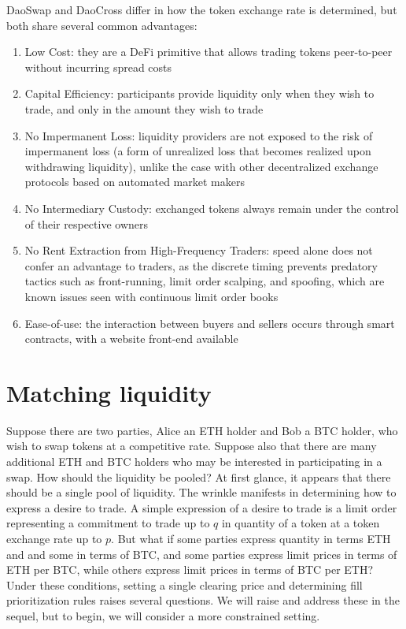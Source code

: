 \documentclass[11pt, reqno]{amsart}
\begin{document}
DaoSwap and DaoCross differ in how the token exchange rate is determined, but
both share several common advantages:
\begin{enumerate}
	\item Low Cost:
	      they are a DeFi primitive that allows trading tokens peer-to-peer
	      without incurring spread costs
	\item Capital Efficiency:
	      participants provide liquidity only when
	      they wish to trade, and only in the amount they wish to trade
	\item No Impermanent Loss:
	      liquidity providers are not exposed to the risk of impermanent loss
	      (a form of unrealized loss that becomes realized upon withdrawing
	      liquidity), unlike the case with other decentralized exchange protocols
	      based on automated market makers
	\item No Intermediary Custody:
	      exchanged tokens always remain under the control of their respective
	      owners
	\item No Rent Extraction from High-Frequency Traders:
	      speed alone does not confer an advantage to traders, as the discrete
	      timing prevents predatory tactics such as front-running, limit order
	      scalping, and spoofing, which are known issues seen with continuous
	      limit order books
	\item Ease-of-use: the interaction between buyers and sellers occurs
	      through smart contracts, with a website front-end available
\end{enumerate}


\section{Matching liquidity}
Suppose there are two parties, Alice an ETH holder and Bob a BTC holder, who
wish to swap tokens at a competitive rate. Suppose also that there are many
additional ETH and BTC holders who may be interested in participating in a
swap. How should the liquidity be pooled? At first glance, it appears that
there should be a single pool of liquidity. The wrinkle manifests in determining
how to express a desire to trade. A simple expression of a desire to trade is
a limit order representing a commitment to trade up to $q$ in quantity of
a token at a token exchange rate up to $p$. But what if some parties express
quantity in terms ETH and and some in terms of BTC, and some parties express
limit prices in terms of ETH per BTC, while others express limit prices in
terms of BTC per ETH? Under these conditions, setting a single clearing price
and determining fill prioritization rules raises several questions. We will
raise and address these in the sequel, but to begin, we will consider a more
constrained setting.
\end{document}
